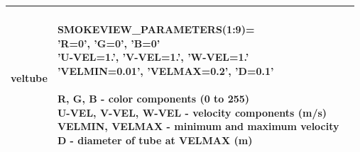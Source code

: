\begin{longtable}[ht]{|l|l|c|}
{\ct veltube} &
\parbox[c]{\boxwidth}{
\hspace{1in} \\
{\ct SMOKEVIEW\_PARAMETERS(1:9)=}\\
{\ct 'R=0', 'G=0',  'B=0'} \\
{\ct 'U-VEL=1.', 'V-VEL=1.', 'W-VEL=1.' }  \\
{\ct 'VELMIN=0.01', 'VELMAX=0.2', 'D=0.1'} \\  \\
R, G, B - color components (0 to 255) \\
U-VEL, V-VEL, W-VEL - velocity components (m/s) \\
VELMIN, VELMAX - minimum and maximum velocity \\
D - diameter of tube at VELMAX (m) \\
\hspace{1in}
} &
 \\ \hline
\end{longtable}

